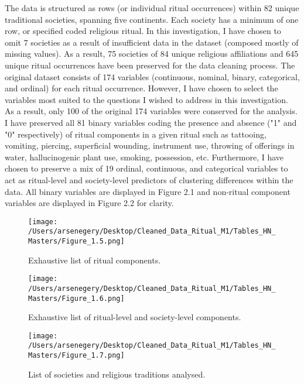 \documentclass[12pt]{report}
\begin{document}
	The data is structured as rows (or individual ritual occurrences) within 82 unique traditional societies, spanning five continents. Each society has a minimum of one row, or specified coded religious ritual. In this investigation, I have chosen to omit 7 societies as a result of insufficient data in the dataset (composed mostly of missing values). As a result, 75 societies of 84 unique religious affiliations and 645 unique ritual occurrences have been preserved for the data cleaning process. The original dataset consists of 174 variables (continuous, nominal, binary, categorical, and ordinal) for each ritual occurrence. However, I have chosen to select the variables most suited to the questions I wished to address in this investigation. As a result, only 100 of the original 174 variables were conserved for the analysis. I have preserved all 81 binary variables coding the presence and absence ("1" and "0" respectively) of ritual components in a given ritual such as tattooing, vomiting, piercing, superficial wounding, instrument use, throwing of offerings in water, hallucinogenic plant use, smoking, possession, etc. Furthermore, I have chosen to preserve a mix of 19 ordinal, continuous, and categorical variables to act as ritual-level and society-level predictors of clustering differences within the data. All binary variables are displayed in Figure 2.1 and non-ritual component variables are displayed in Figure 2.2 for clarity.\\
	
	\begin{figure}[htbp]
		\centering
		\texttt{[image: /Users/arsenegery/Desktop/Cleaned\_Data\_Ritual\_M1/Tables\_HN\_Masters/Figure\_1.5.png]} %
		\caption{Exhaustive list of ritual components.} 
		\label{fig:table5}
	\end{figure}
	
	\begin{figure}[htbp]
		\centering
		\texttt{[image: /Users/arsenegery/Desktop/Cleaned\_Data\_Ritual\_M1/Tables\_HN\_Masters/Figure\_1.6.png]} %
		\caption{Exhaustive list of ritual-level and society-level components.} 
		\label{fig:table6}
	\end{figure}
		
	\begin{figure}[htbp]
		\centering
		\texttt{[image: /Users/arsenegery/Desktop/Cleaned\_Data\_Ritual\_M1/Tables\_HN\_Masters/Figure\_1.7.png]} %
		\caption{List of societies and religious traditions analysed.} 
		\label{fig:table7}
	\end{figure}
	
\end{document}
